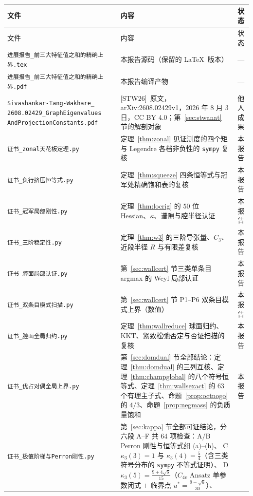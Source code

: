 \documentclass[UTF8,11pt]{ctexart}
\theoremstyle{definition}
\newcommand{\STW}{\textup{[STW26]}}
\begin{document}
{\small
\begin{longtable}{@{}p{6.9cm}p{6.4cm}p{2.0cm}@{}}
\toprule
文件 & 内容 & 状态 \\
\midrule
\endfirsthead
\toprule
文件 & 内容 & 状态 \\
\midrule
\endhead
\texttt{进展报告\_前三大特征值之和的精确上界.tex} & 本报告源码（保留的 \LaTeX\ 版本） & --- \\
\texttt{进展报告\_前三大特征值之和的精确上界.pdf} & 本报告编译产物 & --- \\
\texttt{Sivashankar-Tang-Wakhare\_}\newline
\texttt{2608.02429\_GraphEigenvalues}\newline
\texttt{AndProjectionConstants.pdf} &
\STW\ 原文，arXiv:2608.02429v1，2026 年 8 月 3 日，CC BY 4.0；第~\ref{sec:stwanat} 节的解剖对象 & 他人成果 \\
\texttt{证书\_zonal天花板定理.py} & 定理~\ref{thm:zonal} 见证测度的四个矩与 Legendre 各档非负性的 \texttt{sympy} 复核 & 本报告 \\
\texttt{证书\_负行挤压恒等式.py} & 定理~\ref{thm:squeeze} 四条恒等式与冠军处精确饱和表的复核 & 本报告 \\
\texttt{证书\_冠军局部刚性.py} & 定理~\ref{thm:locrig} 的 $50$ 位 Hessian、$\kappa$、谱隙与腔半径认证 & 本报告 \\
\texttt{证书\_三阶稳定性.py} & 定理~\ref{thm:w3} 的三阶导张量、$C_3$、近段半径 $R$ 与有限差复核 & 本报告 \\
\texttt{证书\_腔面局部认证.py} & 第~\ref{sec:wallcert} 节三类单条目 argmax 的 Weyl 局部认证 & 本报告 \\
\texttt{证书\_双条目模式扫描.py} & 第~\ref{sec:wallcert} 节 P1--P6 双条目模式上界（数值） & 本报告 \\
\texttt{证书\_腔面全局归约.py} & 定理~\ref{thm:wallreduce} 球面归约、KKT、紧致松弛否定与否证扫描的复核 & 本报告 \\
\texttt{证书\_优占对偶全局上界.py} & 第~\ref{sec:domdual} 节全部结论：定理~\ref{thm:domdual} 的三列互核、定理~\ref{thm:champglobal} 的八个符号恒等式、定理~\ref{thm:wallsexact} 的 $63$ 个有理主子式、命题~\ref{prop:octnogo} 的 $4/3$、命题~\ref{prop:negmass} 的负质量饱和 & 本报告 \\
\texttt{证书\_极值阶梯与Perron刚性.py} &
第~\ref{sec:kappa} 节全部可证结论，分六段 A--F 共 $64$ 项检查：A/B Perron 刚性与恒等式组 (a)--(h)、
C $\kappa_3(3)=1$ 与 $\kappa_3(4)=\frac54$（含三类符号分布的 \texttt{sympy} 不等式证明）、
D $\kappa_3(5)=\frac{9+4\sqrt6}{15}$（$C_{4v}$ Ansatz 单参数闭式 $+$ 临界点 $u^*=\frac{9-\sqrt6}{30}$）、

\end{longtable}}
\end{document}
